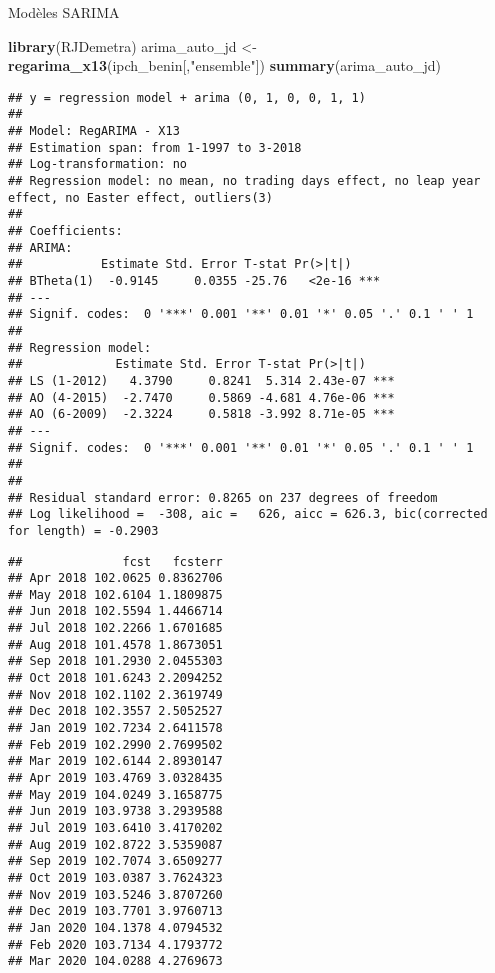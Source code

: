\documentclass[10pt,xcolor=table,color={dvipsnames,usenames},ignorenonframetext,usepdftitle=false,french]{beamer}
\newenvironment{Shaded}{\begin{snugshade}}{\end{snugshade}}
\newcommand{\CommentTok}[1]{\textcolor[rgb]{0.56,0.35,0.01}{\textit{#1}}}
\newcommand{\KeywordTok}[1]{\textcolor[rgb]{0.13,0.29,0.53}{\textbf{#1}}}
\newcommand{\NormalTok}[1]{#1}
\newcommand{\OperatorTok}[1]{\textcolor[rgb]{0.81,0.36,0.00}{\textbf{#1}}}
\newcommand{\StringTok}[1]{\textcolor[rgb]{0.31,0.60,0.02}{#1}}
\begin{document}
\begin{frame}[fragile]{Modèles SARIMA}
\protect\hypertarget{moduxe8les-sarima-2}{}

\begin{Shaded}
\begin{Highlighting}[]
\KeywordTok{library}\NormalTok{(RJDemetra)}
\NormalTok{arima_auto_jd <-}\StringTok{ }\KeywordTok{regarima_x13}\NormalTok{(ipch_benin[,}\StringTok{"ensemble"}\NormalTok{])}
\KeywordTok{summary}\NormalTok{(arima_auto_jd)}
\end{Highlighting}
\end{Shaded}

\begin{verbatim}
## y = regression model + arima (0, 1, 0, 0, 1, 1)
## 
## Model: RegARIMA - X13
## Estimation span: from 1-1997 to 3-2018
## Log-transformation: no
## Regression model: no mean, no trading days effect, no leap year effect, no Easter effect, outliers(3)
## 
## Coefficients:
## ARIMA: 
##           Estimate Std. Error T-stat Pr(>|t|)    
## BTheta(1)  -0.9145     0.0355 -25.76   <2e-16 ***
## ---
## Signif. codes:  0 '***' 0.001 '**' 0.01 '*' 0.05 '.' 0.1 ' ' 1
## 
## Regression model: 
##             Estimate Std. Error T-stat Pr(>|t|)    
## LS (1-2012)   4.3790     0.8241  5.314 2.43e-07 ***
## AO (4-2015)  -2.7470     0.5869 -4.681 4.76e-06 ***
## AO (6-2009)  -2.3224     0.5818 -3.992 8.71e-05 ***
## ---
## Signif. codes:  0 '***' 0.001 '**' 0.01 '*' 0.05 '.' 0.1 ' ' 1
## 
## 
## Residual standard error: 0.8265 on 237 degrees of freedom
## Log likelihood =  -308, aic =   626, aicc = 626.3, bic(corrected for length) = -0.2903
\end{verbatim}

\begin{Shaded}
\end{Shaded}

\begin{verbatim}
##              fcst   fcsterr
## Apr 2018 102.0625 0.8362706
## May 2018 102.6104 1.1809875
## Jun 2018 102.5594 1.4466714
## Jul 2018 102.2266 1.6701685
## Aug 2018 101.4578 1.8673051
## Sep 2018 101.2930 2.0455303
## Oct 2018 101.6243 2.2094252
## Nov 2018 102.1102 2.3619749
## Dec 2018 102.3557 2.5052527
## Jan 2019 102.7234 2.6411578
## Feb 2019 102.2990 2.7699502
## Mar 2019 102.6144 2.8930147
## Apr 2019 103.4769 3.0328435
## May 2019 104.0249 3.1658775
## Jun 2019 103.9738 3.2939588
## Jul 2019 103.6410 3.4170202
## Aug 2019 102.8722 3.5359087
## Sep 2019 102.7074 3.6509277
## Oct 2019 103.0387 3.7624323
## Nov 2019 103.5246 3.8707260
## Dec 2019 103.7701 3.9760713
## Jan 2020 104.1378 4.0794532
## Feb 2020 103.7134 4.1793772
## Mar 2020 104.0288 4.2769673
\end{verbatim}

\end{frame}
\end{document}
